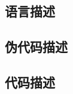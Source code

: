 \documentclass{article}
\begin{document}
\subsection{语言描述} 



\subsection{伪代码描述}



\begin{codebox}


\end{codebox}



\subsection{代码描述}

\begin{verbatim}


\end{verbatim}
\end{document}
